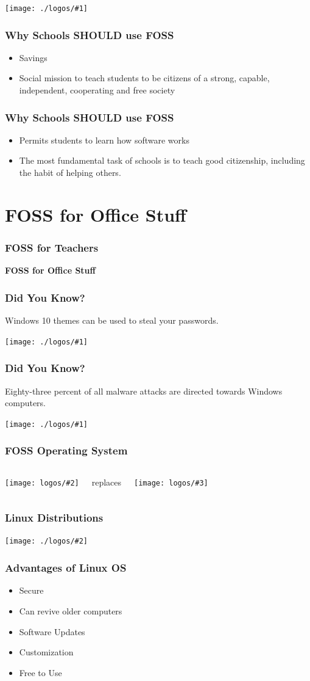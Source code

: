 \documentclass[17pt]{beamer}
\newcommand{\fullpic}[1]{\begin{frame}
\texttt{[image: ./logos/\#1]}
\end{frame}
}
\newcommand{\frontpic}[2]{\begin{frame}
		\frametitle{#1}
		\texttt{[image: ./logos/\#2]}
	\end{frame}
}
\newcommand{\trivia}[1]{\begin{frame}
		\frametitle{Did You Know?}
		\begin{center}
			#1
		\end{center}
	\end{frame}
}
\newcommand{\versus}[3]{\begin{frame}
		\frametitle{#1}
		\begin{columns}
			\column{0.37\textwidth}
			\begin{center}
				\texttt{[image: logos/\#2]}
			\end{center}
			
			\column{0.26\textwidth}
			\begin{center}
				\noindent replaces
			\end{center}
			
			\column{0.37\textwidth}
			\begin{center}
				\texttt{[image: logos/\#3]}
			\end{center}
		\end{columns}
\end{frame}}
\begin{document}
    \fullpic{schools-foss}

    \begin{frame}
    	\frametitle{Why Schools SHOULD use FOSS}
    	\begin{itemize}
    		\item<1-> Savings
    		\item<2-> Social mission to teach students to be citizens of a strong, capable, independent, cooperating and free society
    	\end{itemize}		
    \end{frame}

    \begin{frame}
    	\frametitle{Why Schools SHOULD use FOSS}
    	\begin{itemize}
    		\item<1-> Permits students to learn how software works
    		\item<2-> The most fundamental task of schools is to teach good citizenship, including the habit of helping others.
    	\end{itemize}		
    \end{frame}

	\section{FOSS for Office Stuff}
	\begin{frame}
		\frametitle{FOSS for Teachers}
		\begin{center}
			\textbf{\LARGE FOSS for Office Stuff}
		\end{center} 
	\end{frame}

	\trivia{Windows 10 themes can be used to steal your passwords.}
	
	\fullpic{windows-steal-passwords}
	
	\trivia{Eighty-three percent of all malware attacks are directed towards Windows computers.}
	
	\fullpic{windows-attack}

	\versus{FOSS Operating System}{linux}{windows_10_logo}
	
	\frontpic{Linux Distributions}{distros}
	
	\begin{frame}
		\frametitle{Advantages of Linux OS}
		\begin{itemize}
			\item<1-> Secure
			\item<2-> Can revive older computers
			\item<3-> Software Updates
			\item<4-> Customization
			\item<5-> Free to Use
		\end{itemize}		
	\end{frame}
	
\end{document}
